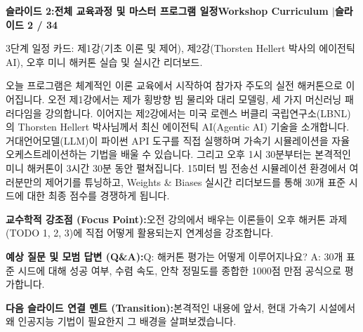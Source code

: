 \documentclass[11pt,a4paper]{article}
\begin{document}
\clearpage
\hypertarget{slide.2}{}
{}
\noindent\begin{tcolorbox}[colback=navy,colframe=navy,left=6pt,right=6pt,top=3pt,bottom=3pt,boxrule=0pt,arc=2pt]
{\large\bfseries\color{white}슬라이드 2:\enspace 전체 교육과정 및 마스터 프로그램 일정}\hfill{\footnotesize\bfseries\color{white!85!lightbg}Workshop Curriculum \enspace$|$\enspace 슬라이드 2 / 34}
\end{tcolorbox}
\vspace{0.2em}
\begin{tcolorbox}[colback=lightbg,colframe=bordergray,title={\footnotesize\bfseries\color{darkgray}슬라이드 시각 구성 요약},fontupper=\small,left=6pt,right=6pt,top=2.5pt,bottom=2.5pt,boxrule=0.6pt,arc=2.5pt]
3단계 일정 카드: 제1강(기초 이론 및 제어), 제2강(Thorsten Hellert 박사의 에이전틱 AI), 오후 미니 해커톤 실습 및 실시간 리더보드.
\end{tcolorbox}
\vspace{0.2em}
\begin{tcolorbox}[colback=white,colframe=primaryblue,title={\footnotesize\bfseries\color{white}발표자 구두 대본 (Spoken Script)},fontupper=\small,left=6pt,right=6pt,top=3pt,bottom=3pt,boxrule=0.8pt,arc=2.5pt]
오늘 프로그램은 체계적인 이론 교육에서 시작하여 참가자 주도의 실전 해커톤으로 이어집니다. 오전 제1강에서는 제가 횡방향 빔 물리와 대리 모델링, 세 가지 머신러닝 패러다임을 강의합니다. 이어지는 제2강에서는 미국 로렌스 버클리 국립연구소(LBNL)의 Thorsten Hellert 박사님께서 최신 에이전틱 AI(Agentic AI) 기술을 소개합니다. 거대언어모델(LLM)이 파이썬 API 도구를 직접 실행하며 가속기 시뮬레이션을 자율 오케스트레이션하는 기법을 배울 수 있습니다. 그리고 오후 1시 30분부터는 본격적인 미니 해커톤이 3시간 30분 동안 펼쳐집니다. 15미터 빔 전송선 시뮬레이션 환경에서 여러분만의 제어기를 튜닝하고, Weights \& Biases 실시간 리더보드를 통해 30개 표준 시드에 대한 최종 점수를 경쟁하게 됩니다.
\end{tcolorbox}
\vspace{0.2em}
\begin{tcolorbox}[colback=lightbg,colframe=bordergray,left=6pt,right=6pt,top=3pt,bottom=3pt,boxrule=0.6pt,arc=2.5pt]
\small
\noindent\textbf{\color{navy}교수학적 강조점 (Focus Point):}\enspace 오전 강의에서 배우는 이론들이 오후 해커톤 과제(TODO 1, 2, 3)에 직접 어떻게 활용되는지 연계성을 강조합니다.\par\vspace{0.3em}
\noindent\textbf{\color{successgreen}예상 질문 및 모범 답변 (Q\&A):}\enspace Q: 해커톤 평가는 어떻게 이루어지나요? A: 30개 표준 시드에 대해 성공 여부, 수렴 속도, 안착 정밀도를 종합한 1000점 만점 공식으로 평가합니다.\par\vspace{0.3em}
\noindent\textbf{\color{accent}다음 슬라이드 연결 멘트 (Transition):}\enspace 본격적인 내용에 앞서, 현대 가속기 시설에서 왜 인공지능 기법이 필요한지 그 배경을 살펴보겠습니다.
\end{tcolorbox}
\end{document}
